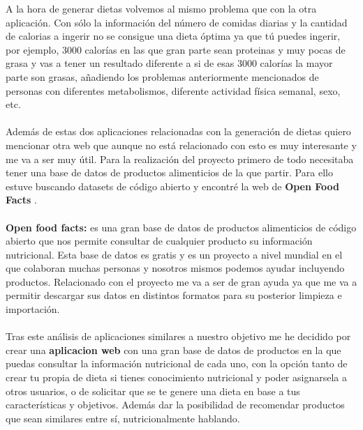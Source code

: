 A la hora de generar dietas volvemos al mismo problema que con la otra aplicación. Con sólo la información del número de comidas diarias y la cantidad de calorias a ingerir
no se consigue una dieta óptima ya que tú puedes ingerir, por ejemplo, 3000 calorías en las que gran parte sean proteinas y muy pocas de grasa y vas a tener un resultado diferente a si de 
esas 3000 calorías la mayor parte son grasas, añadiendo los problemas anteriormente mencionados de personas con diferentes metabolismos, diferente actividad física semanal, sexo, etc.
\\\\ 
Además de estas dos aplicaciones relacionadas con la generación de dietas quiero mencionar otra web que aunque no está relacionado con esto es muy interesante y me va a ser muy útil.
Para la realización del proyecto primero de todo necesitaba tener una base de datos de productos alimenticios de la que partir. Para ello estuve buscando datasets de código abierto y encontré la web de \textbf{Open Food Facts} \cite{OpenFoodFacts}.
\\\\
\textbf{Open food facts:} es una gran base de datos de productos alimenticios de código abierto que nos permite consultar de cualquier producto su información nutricional.
Esta base de datos es gratis y es un proyecto a nivel mundial en el que colaboran muchas personas y nosotros mismos podemos ayudar incluyendo productos.
Relacionado con el proyecto me va a ser de gran ayuda ya que me va a permitir descargar sus datos en distintos formatos para su posterior limpieza e importación.
\\\\
Tras este análisis de aplicaciones similares a nuestro objetivo me he decidido por crear una \textbf{aplicacion web} con una gran base de datos de productos en la que puedas consultar
la información nutricional de cada uno, con la opción tanto de crear tu propia de dieta si tienes conocimiento nutricional y poder asignarsela a otros usuarios, o de solicitar que 
se te genere una dieta en base a tus características y objetivos. Además dar la posibilidad de recomendar productos que sean similares entre sí, nutricionalmente hablando.


